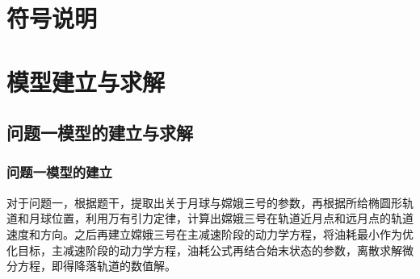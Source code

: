 \documentclass{ctexart}
\begin{document}
    \section{符号说明}
\begin{center}
\end{center}

    \section{模型建立与求解}
    \subsection{问题一模型的建立与求解}

    \subsubsection{问题一模型的建立}
对于问题一，根据题干，提取出关于月球与嫦娥三号的参数，再根据所给椭圆形轨道和月球位置，利用万有引力定律，计算出嫦娥三号在轨道近月点和远月点的轨道速度和方向。之后再建立嫦娥三号在主减速阶段的动力学方程，将油耗最小作为优化目标，主减速阶段的动力学方程，油耗公式再结合始末状态的参数，离散求解微分方程，即得降落轨道的数值解。
\end{document}

